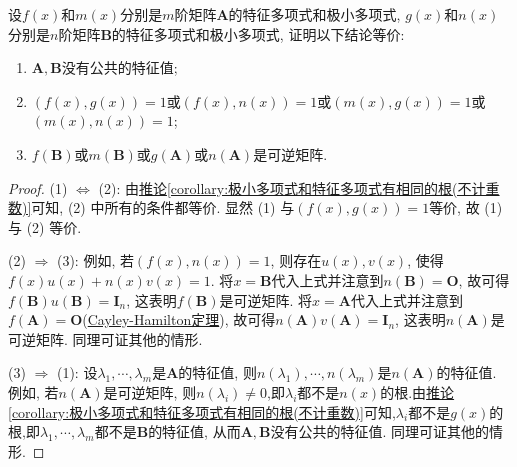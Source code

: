 \documentclass[../../main.tex]{subfiles}%
\begin{document}
\begin{proposition}\label{proposition:两个没有公共特征值的矩阵的极小多项式与特征多项式的关系}
设\(f(x)\)和\(m(x)\)分别是\(m\)阶矩阵\(\boldsymbol{A}\)的特征多项式和极小多项式, \(g(x)\)和\(n(x)\)分别是\(n\)阶矩阵\(\boldsymbol{B}\)的特征多项式和极小多项式, 证明以下结论等价:
\begin{enumerate}[(1)]
\item \(\boldsymbol{A},\boldsymbol{B}\)没有公共的特征值;

\item \((f(x),g(x)) = 1\)或\((f(x),n(x)) = 1\)或\((m(x),g(x)) = 1\)或\((m(x),n(x)) = 1\);

\item \(f(\boldsymbol{B})\)或\(m(\boldsymbol{B})\)或\(g(\boldsymbol{A})\)或\(n(\boldsymbol{A})\)是可逆矩阵.
\end{enumerate}
\end{proposition}
\begin{proof}

(1) \(\Leftrightarrow\) (2): 由\hyperref[corollary:极小多项式和特征多项式有相同的根(不计重数)]{推论\ref{corollary:极小多项式和特征多项式有相同的根(不计重数)}}可知, (2) 中所有的条件都等价. 显然 (1) 与\((f(x),g(x)) = 1\)等价, 故 (1) 与 (2) 等价.

(2) \(\Rightarrow\) (3): 例如, 若\((f(x),n(x)) = 1\), 则存在\(u(x),v(x)\), 使得\(f(x)u(x) + n(x)v(x) = 1\). 将\(x = \boldsymbol{B}\)代入上式并注意到\(n(\boldsymbol{B}) = \boldsymbol{O}\), 故可得\(f(\boldsymbol{B})u(\boldsymbol{B}) = \boldsymbol{I}_n\), 这表明\(f(\boldsymbol{B})\)是可逆矩阵. 将\(x = \boldsymbol{A}\)代入上式并注意到\(f(\boldsymbol{A}) = \boldsymbol{O}\)(\hyperref[theorem:Cayley-Hamilton定理]{Cayley-Hamilton定理}), 故可得\(n(\boldsymbol{A})v(\boldsymbol{A}) = \boldsymbol{I}_n\), 这表明\(n(\boldsymbol{A})\)是可逆矩阵. 同理可证其他的情形.

(3) \(\Rightarrow\) (1): 设\(\lambda_1,\cdots,\lambda_m\)是\(\boldsymbol{A}\)的特征值, 则\(n(\lambda_1),\cdots,n(\lambda_m)\)是\(n(\boldsymbol{A})\)的特征值. 例如, 若\(n(\boldsymbol{A})\)是可逆矩阵, 则\(n(\lambda_i)\neq 0\),即$\lambda_i$都不是$n(x)$的根.由\hyperref[corollary:极小多项式和特征多项式有相同的根(不计重数)]{推论\ref{corollary:极小多项式和特征多项式有相同的根(不计重数)}}可知,$\lambda_i$都不是$g(x)$的根,即\(\lambda_1,\cdots,\lambda_m\)都不是\(\boldsymbol{B}\)的特征值, 从而\(\boldsymbol{A},\boldsymbol{B}\)没有公共的特征值. 同理可证其他的情形.

\end{proof}
\end{document}
